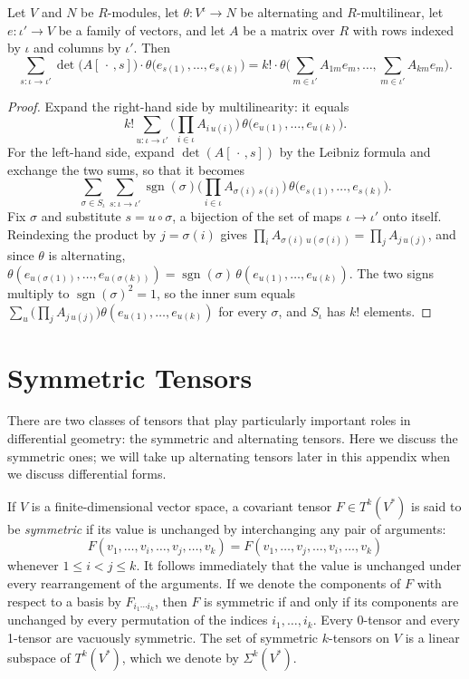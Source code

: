 \begin{lemma}
\label{lem:alternating-cauchy-binet}
\leanok
Let $V$ and $N$ be $R$-modules, let $\theta \colon V^{\iota} \to N$ be alternating and $R$-multilinear, let $e \colon \iota' \to V$ be a family of vectors, and let $A$ be a matrix over $R$ with rows indexed by $\iota$ and columns by $\iota'$. Then
\[
\sum_{s \colon \iota \to \iota'} \det\big(A[\,\cdot\,, s]\big) \cdot \theta\big(e_{s(1)}, \ldots, e_{s(k)}\big) = k! \cdot \theta\Big(\sum_{m \in \iota'} A_{1m} e_m, \ldots, \sum_{m \in \iota'} A_{km} e_m\Big).
\]
\end{lemma}
\begin{proof}
\leanok
Expand the right-hand side by multilinearity: it equals
\[
k! \sum_{u \colon \iota \to \iota'} \Big(\prod_{i \in \iota} A_{i\,u(i)}\Big)\,\theta\big(e_{u(1)}, \ldots, e_{u(k)}\big).
\]
For the left-hand side, expand $\det(A[\,\cdot\,, s])$ by the Leibniz formula and exchange the two sums, so that it becomes
\[
\sum_{\sigma \in S_\iota} \sum_{s \colon \iota \to \iota'} \operatorname{sgn}(\sigma)\Big(\prod_{i \in \iota} A_{\sigma(i)\,s(i)}\Big)\,\theta\big(e_{s(1)}, \ldots, e_{s(k)}\big).
\]
Fix $\sigma$ and substitute $s = u \circ \sigma$, a bijection of the set of maps $\iota \to \iota'$ onto itself. Reindexing the product by $j = \sigma(i)$ gives $\prod_{i} A_{\sigma(i)\,u(\sigma(i))} = \prod_{j} A_{j\,u(j)}$, and since $\theta$ is alternating, $\theta(e_{u(\sigma(1))}, \ldots, e_{u(\sigma(k))}) = \operatorname{sgn}(\sigma)\,\theta(e_{u(1)}, \ldots, e_{u(k)})$. The two signs multiply to $\operatorname{sgn}(\sigma)^2 = 1$, so the inner sum equals $\sum_{u} \big(\prod_{j} A_{j\,u(j)}\big)\theta(e_{u(1)}, \ldots, e_{u(k)})$ for every $\sigma$, and $S_\iota$ has $k!$ elements.
\end{proof}

\section{Symmetric Tensors}

There are two classes of tensors that play particularly important roles in differential geometry: the symmetric and alternating tensors. Here we discuss the symmetric ones; we will take up alternating tensors later in this appendix when we discuss differential forms.

If $V$ is a finite-dimensional vector space, a covariant tensor $F \in T^k(V^*)$ is said to be \textit{symmetric} if its value is unchanged by interchanging any pair of arguments:
\[
F(v_1,\ldots,v_i,\ldots,v_j,\ldots,v_k) = F(v_1,\ldots,v_j,\ldots,v_i,\ldots,v_k)
\]
whenever $1 \le i < j \le k$. It follows immediately that the value is unchanged under every rearrangement of the arguments. If we denote the components of $F$ with respect to a basis by $F_{i_1 \cdots i_k}$, then $F$ is symmetric if and only if its components are unchanged by every permutation of the indices $i_1,\ldots,i_k$. Every 0-tensor and every 1-tensor are vacuously symmetric. The set of symmetric $k$-tensors on $V$ is a linear subspace of $T^k(V^*)$, which we denote by $\Sigma^k(V^*)$.

